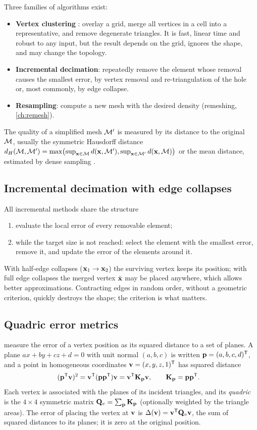 Three families of algorithms exist:
\begin{itemize}
  \item \textbf{Vertex clustering} \citep{Rossignac1993}: overlay a grid, merge all vertices in a
  cell into a representative, and remove degenerate triangles. It is fast, linear time and robust
  to any input, but the result depends on the grid, ignores the shape, and may change the
  topology.
  \item \textbf{Incremental decimation}: repeatedly remove the element whose removal causes the
  smallest error, by vertex removal and re-triangulation of the hole \citep{Schroeder1992} or,
  most commonly, by edge collapse.
  \item \textbf{Resampling}: compute a new mesh with the desired density (remeshing,
  \cref{ch:remesh}).
\end{itemize}
The quality of a simplified mesh $\mathcal{M}'$ is measured by its distance to the original $\mathcal{M}$, usually
the symmetric Hausdorff distance
$d_H(\mathcal{M},\mathcal{M}')=\max\bigl(\sup_{\mathbf{x}\in\mathcal{M}}d(\mathbf{x},\mathcal{M}'),\sup_{\mathbf{x}\in\mathcal{M}'}d(\mathbf{x},\mathcal{M})\bigr)$ or the mean
distance, estimated by dense sampling \citep{Cignoni1998}.

\subsection{Incremental decimation with edge collapses}

All incremental methods share the structure
\begin{enumerate}
  \item evaluate the local error of every removable element;
  \item while the target size is not reached: select the element with the smallest error, remove
  it, and update the error of the elements around it.
\end{enumerate}
With half-edge collapses ($\mathbf{x}_1\to\mathbf{x}_2$) the surviving vertex keeps its position; with full edge
collapses the merged vertex $\bar{\mathbf{x}}$ may be placed anywhere, which allows better approximations.
Contracting edges in random order, without a geometric criterion, quickly destroys the shape; the
criterion is what matters.

\subsection{Quadric error metrics}

 measure the error of a vertex position as its squared distance to a set of
planes. A plane $ax+by+cz+d=0$ with unit normal $(a,b,c)$ is written $\mathbf{p}=(a,b,c,d)^{\mathsf{T}}$, and a point
in homogeneous coordinates $\mathbf{v}=(x,y,z,1)^{\mathsf{T}}$ has squared distance
\begin{equation}
(\mathbf{p}^{\mathsf{T}}\mathbf{v})^2=\mathbf{v}^{\mathsf{T}}(\mathbf{p}\mathbf{p}^{\mathsf{T}})\mathbf{v}=\mathbf{v}^{\mathsf{T}}\mathbf{K}_{\mathbf{p}}\mathbf{v} ,\qquad \mathbf{K}_{\mathbf{p}}=\mathbf{p}\mathbf{p}^{\mathsf{T}} .
\end{equation}
Each vertex is associated with the planes of its incident triangles, and its \emph{quadric} is
the $4\times4$ symmetric matrix $\mathbf{Q}_v=\sum_{\mathbf{p}}\mathbf{K}_{\mathbf{p}}$ (optionally weighted by the triangle
areas). The error of placing the vertex at $\mathbf{v}$ is $\Delta(\mathbf{v})=\mathbf{v}^{\mathsf{T}}\mathbf{Q}_v\mathbf{v}$, the sum of squared
distances to its planes; it is zero at the original position.

